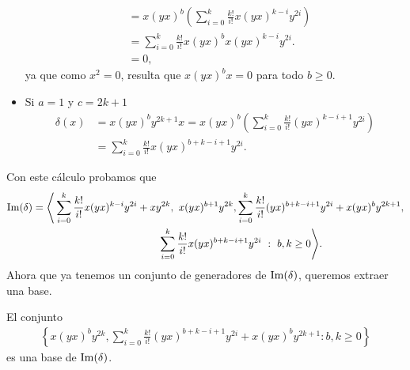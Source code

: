 \documentclass[fleqn,../tesis.tex]{subfiles}
\begin{document}
\begin{itemize}
\begin{align*}
		&= x(yx)^b\left( \sum_{i = 0}^k\frac{k!}{i!}x(yx)^{k - i}y^{2i}\right) \\
		&= \sum_{i = 0}^k\frac{k!}{i!}x(yx)^bx(yx)^{k - i}y^{2i}. \\
		& = 0,
	\end{align*}
	ya que como $x^2 = 0$, resulta que $x(yx)^bx = 0$ para todo $b \geq 0$.
\item Si $a = 1$ y $c = 2k + 1$
	\begin{align*}
		\delta(x) &= x(yx)^by^{2k + 1}x = x(yx)^b\left( \sum_{i = 0}^k\frac{k!}{i!}(yx)^{k - i + 1}y^{2i}\right) \\
		&= \sum_{i = 0}^k\frac{k!}{i!}x(yx)^{b + k - i + 1}y^{2i}.
	\end{align*}
\end{itemize}
Con este cálculo probamos que
\begin{align*}
	\Ima(\delta) = \Bigg\langle &\sum_{i = 0}^k\frac{k!}{i!}x(yx)^{k - i}y^{2i} + xy^{2k},\ x(yx)^{b + 1}y^{2k},
		 \sum_{i = 0}^k\frac{k!}{i!}(yx)^{b + k - i + 1}y^{2i} + x(yx)^by^{2k + 1}, \\
		&\hspace{100pt}\sum_{i = 0}^k\frac{k!}{i!}x(yx)^{b + k - i + 1}y^{2i}\ :\ b,k \geq 0	\Bigg\rangle.
\end{align*}
Ahora que ya tenemos un conjunto de generadores de $\operatorname{Im}(\delta)$, queremos extraer una base.
\begin{prop}
\label{imdelta}
El conjunto
\begin{align*}
		\left\{ x(yx)^by^{2k},
			\sum_{i = 0}^k\frac{k!}{i!}(yx)^{b + k - i + 1}y^{2i} + x(yx)^by^{2k + 1} :b, k \geq 0 \right\}
\end{align*}
es una base de $\operatorname{Im}(\delta)$.
\end{prop}
\end{document}
